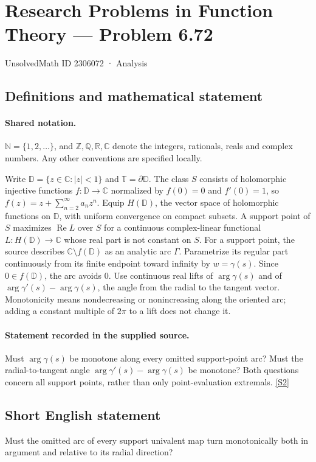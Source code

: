 \documentclass[11pt]{article}
\newcommand{\sref}[2]{\hyperlink{source:#1:#2}{[S#2]}}
\begin{document}
\setcounter{section}{2306071}
\section{Research Problems in Function Theory — Problem 6.72}\label{2306072}
{\small\sffamily UnsolvedMath ID 2306072 · Analysis}
\subsection{Definitions and mathematical statement}

\paragraph{Shared notation.}$\mathbb N=\{1,2,\ldots\}$, and $\mathbb Z,\mathbb Q,\mathbb R,\mathbb C$ denote the integers, rationals, reals and complex numbers. Any other conventions are specified locally.


Write $\mathbb D=\{z\in\mathbb C:|z|<1\}$ and $\mathbb T=\partial\mathbb D$. The class $S$ consists of holomorphic injective functions $f:\mathbb D\to\mathbb C$ normalized by $f(0)=0$ and $f'(0)=1$, so $f(z)=z+\sum_{n=2}^{\infty}a_nz^n$. Equip $H(\mathbb D)$, the vector space of holomorphic functions on $\mathbb D$, with uniform convergence on compact subsets. A support point of $S$ maximizes $\operatorname{Re}L$ over $S$ for a continuous complex-linear functional $L:H(\mathbb D)\to\mathbb C$ whose real part is not constant on $S$. For a support point, the source describes $\mathbb C\setminus f(\mathbb D)$ as an analytic arc $\Gamma$. Parametrize its regular part continuously from its finite endpoint toward infinity by $w=\gamma(s)$. Since $0\in f(\mathbb D)$, the arc avoids $0$. Use continuous real lifts of $\arg\gamma(s)$ and of $\arg\gamma'(s)-\arg\gamma(s)$, the angle from the radial to the tangent vector. Monotonicity means nondecreasing or nonincreasing along the oriented arc; adding a constant multiple of $2\pi$ to a lift does not change it.
\paragraph{Statement recorded in the supplied source.}
Must $\arg\gamma(s)$ be monotone along every omitted support-point arc? Must the radial-to-tangent angle $\arg\gamma'(s)-\arg\gamma(s)$ be monotone? Both questions concern all support points, rather than only point-evaluation extremals. \sref{2306072}{2}
\subsection{Short English statement}
Must the omitted arc of every support univalent map turn monotonically both in argument and relative to its radial direction?
\end{document}
